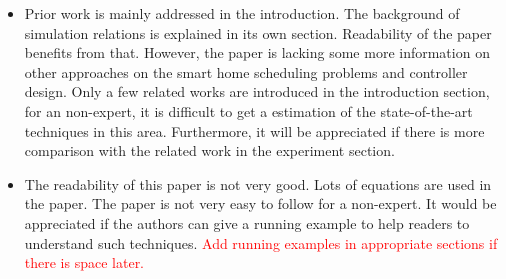 \documentclass{sig-alternate}
\begin{document}
\begin{itemize}
\item Prior work is mainly addressed in the introduction. The background of
simulation 
relations is explained in its own section. Readability of the paper benefits
from 
that. However, the paper is lacking some more information on other approaches
on 
the smart home scheduling problems and controller design.
Only a few related works are introduced in the introduction section, for an
non-expert, it is difficult to get a estimation of the state-of-the-art
techniques in this area. Furthermore, it will be appreciated if there is more
comparison with the related work in the experiment section.
\item The readability of this paper is not very good. Lots of equations are used
in the paper. The paper is not very easy to follow for a non-expert. It would
be appreciated if the authors can give a running example to help readers to
understand such techniques. \textcolor{red}{Add running examples in appropriate sections if there is space later.}
\end{itemize}





















%


%

\newpage
\appendix



\end{document}

